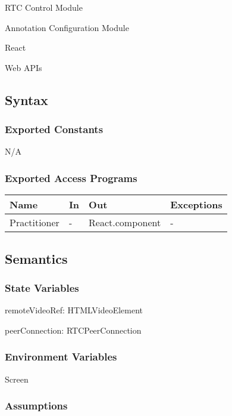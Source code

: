 \documentclass[12pt, titlepage]{article}
\begin{document}
\noindent RTC Control Module

\noindent Annotation Configuration Module

\noindent React

\noindent Web APIs

\subsection{Syntax}

\subsubsection{Exported Constants}

N/A

\subsubsection{Exported Access Programs}

\begin{center}
  \begin{tabular}{p{4cm} p{4cm} p{4cm} p{2cm}}
    \hline
    \textbf{Name}      & \textbf{In} & \textbf{Out}          & \textbf{Exceptions} \\
    \hline
    Practitioner & -     & React.component & -             \\
    \hline
  \end{tabular}
\end{center}

\subsection{Semantics}

\subsubsection{State Variables}

\noindent remoteVideoRef: HTMLVideoElement

\noindent peerConnection: RTCPeerConnection

\subsubsection{Environment Variables}

\noindent Screen

\subsubsection{Assumptions}
\end{document}
